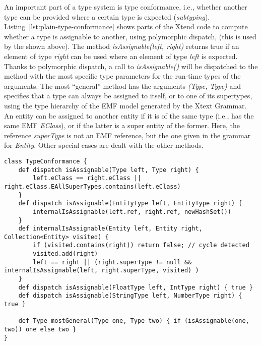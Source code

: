 An important part of a type system is type conformance, i.e., whether another
type can be provided where a certain type is expected (\emph{subtyping}).
Listing~\ref{lst:plain-type-conformance} shows parts of the Xtend code to
compute whether a type is assignable to another, using polymorphic dispatch, (this is used by
the  shown above).
The method
\emph{isAssignable(left, right)} returns true if an element of type \emph{right}
can be used where an element of type \emph{left} is expected.
Thanks to polymorphic dispatch, a call to \emph{isAssignable()} will be
dispatched to the method with the most specific type parameters for the run-time
types of the arguments. The most ``general'' method has the arguments
\emph{(Type, Type)} and specifies that a type can always be assigned to itself,
or to one of its supertypes, using the type hierarchy of the EMF model generated
by the Xtext Grammar.
An entity can be assigned to another entity if it is of the same type (i.e., has
the same EMF \emph{EClass}), or if the latter is a super entity of the former.
Here, the reference \emph{superType} is not an EMF reference, but the one given
in the grammar for \emph{Entity}. Other special cases are dealt with the
other methods. 

\begin{lstlisting}[language=xtend,float=tb,label=lst:plain-type-conformance,caption=Type
conformance specification (Xtend code).] 
class TypeConformance {
	def dispatch isAssignable(Type left, Type right) {
		left.eClass == right.eClass || right.eClass.EAllSuperTypes.contains(left.eClass) 
	}
	def dispatch isAssignable(EntityType left, EntityType right) {
		internalIsAssignable(left.ref, right.ref, newHashSet())
	}
	def internalIsAssignable(Entity left, Entity right, Collection<Entity> visited) {
		if (visited.contains(right)) return false; // cycle detected
		visited.add(right)
		left == right || (right.superType != null && internalIsAssignable(left, right.superType, visited) )
	}
	def dispatch isAssignable(FloatType left, IntType right) { true }
	def dispatch isAssignable(StringType left, NumberType right) { true }

	def Type mostGeneral(Type one, Type two) { if (isAssignable(one, two)) one else two }
}
\end{lstlisting}


